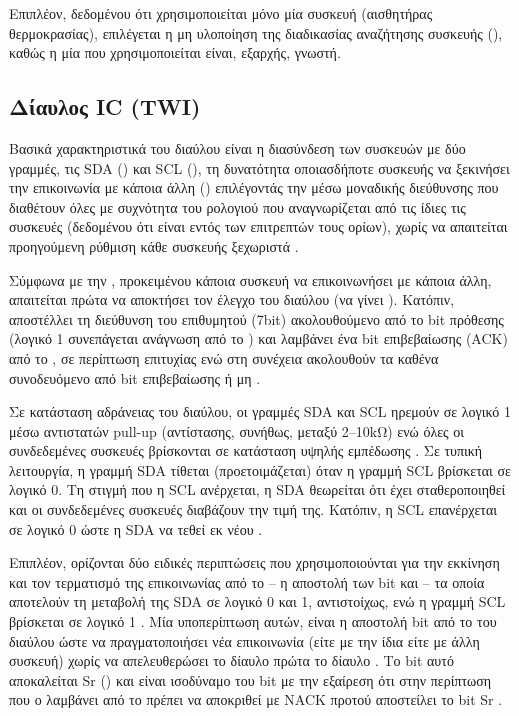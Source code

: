 Επιπλέον, δεδομένου ότι χρησιμοποιείται μόνο μία συσκευή (αισθητήρας
θερμοκρασίας), επιλέγεται η μη υλοποίηση της διαδικασίας αναζήτησης 
συσκευής (), καθώς η μία που χρησιμοποιείται είναι, εξαρχής,
γνωστή.


\subsection{Δίαυλος I\protect{}C (TWI)}
\label{subsec:i2c}


Βασικά χαρακτηριστικά του διαύλου είναι η διασύνδεση των συσκευών με δύο
γραμμές, τις SDA () και SCL (), τη δυνατότητα
οποιασδήποτε συσκευής να ξεκινήσει την επικοινωνία με κάποια άλλη
() επιλέγοντάς την μέσω μοναδικής διεύθυνσης που διαθέτουν
όλες με συχνότητα του ρολογιού που αναγνωρίζεται από τις ίδιες τις συσκευές
(δεδομένου ότι είναι εντός των επιτρεπτών τους ορίων), χωρίς να απαιτείται
προηγούμενη ρύθμιση κάθε συσκευής ξεχωριστά \parencite[3--4,6]{nxp14}.

Σύμφωνα με την \textcite[6]{nxp14}, προκειμένου κάποια συσκευή να επικοινωνήσει
με κάποια άλλη, απαιτείται πρώτα να αποκτήσει τον έλεγχο του διαύλου (να γίνει
). Κατόπιν, αποστέλλει τη διεύθυνση του επιθυμητού  (7bit)
ακολουθούμενο από το bit πρόθεσης (λογικό 1 συνεπάγεται ανάγνωση από το
) και λαμβάνει ένα bit επιβεβαίωσης (ACK) από το , σε
περίπτωση επιτυχίας ενώ στη συνέχεια ακολουθούν τα  καθένα συνοδευόμενο
από bit επιβεβαίωσης ή μη \parencite[10,13]{nxp14}.

Σε κατάσταση αδράνειας του διαύλου, οι γραμμές SDA και SCL ηρεμούν σε λογικό 1
μέσω αντιστατών pull-up (αντίστασης, συνήθως, μεταξύ 2--10kΩ) ενώ όλες οι
συνδεδεμένες συσκευές βρίσκονται σε κατάσταση υψηλής εμπέδωσης
\parencites[13]{phillips03}[8]{nxp14}. Σε τυπική λειτουργία, η γραμμή SDA
τίθεται (προετοιμάζεται) όταν η γραμμή SCL βρίσκεται σε λογικό 0. Τη στιγμή που
η SCL ανέρχεται, η SDA θεωρείται ότι έχει σταθεροποιηθεί και οι συνδεδεμένες
συσκευές διαβάζουν την τιμή της. Κατόπιν, η SCL επανέρχεται σε λογικό 0 ώστε η
SDA να τεθεί εκ νέου \parencite[9]{nxp14}.

Επιπλέον, ορίζονται δύο ειδικές περιπτώσεις που χρησιμοποιούνται για την
εκκίνηση και τον τερματισμό της επικοινωνίας από το  -- η αποστολή
των bit  και  -- τα οποία αποτελούν τη μεταβολή της SDA σε
λογικό 0 και 1, αντιστοίχως, ενώ η γραμμή SCL βρίσκεται σε λογικό 1
\parencite[9]{nxp14}. Μία υποπερίπτωση αυτών, είναι η αποστολή bit 
από το  του διαύλου ώστε να πραγματοποιήσει νέα επικοινωνία (είτε με
την ίδια είτε με άλλη συσκευή) χωρίς να απελευθερώσει το δίαυλο πρώτα το δίαυλο
\parencite[13]{nxp14}. Το bit αυτό αποκαλείται Sr () και
είναι ισοδύναμο του bit  με την εξαίρεση ότι στην περίπτωση που ο
 λαμβάνει από το  πρέπει να αποκριθεί με NACK προτού
αποστείλει το bit Sr \parencite[13--14]{nxp14}.

